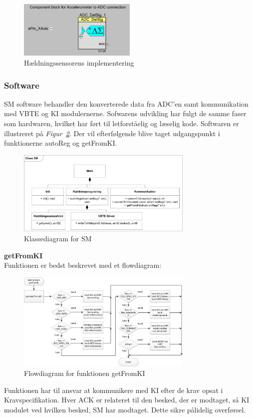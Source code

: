 \begin{figure}[htbp]
	\centering
	\includegraphics[width=0.50\textwidth]{billeder/levelsensor}
	\caption{Hældningssensorens implementering}
	\label{fig:levelsensor}
\end{figure}
\subsubsection{Software}
SM software behandler den konverterede data fra ADC'en samt kommunikation med VBTE og KI modulernerne. Sofwarens udvikling har fulgt de samme faser som hardwaren, hvilket har ført til letforståelig og læselig kode. Softwaren er illustreret på \textit{Figur~\ref{fig:SMKD}}. Der vil efterfølgende blive taget udgangspunkt i funktionerne autoReg og getFromKI.
\begin{figure}[H]
	\centering
	\includegraphics[width=0.75\textwidth]{billeder/smKlassediagram}
	\caption{Klassediagram for SM}
	\label{fig:SMKD}
\end{figure}
\textbf{getFromKI}\\
Funktionen er bedst beskrevet med et flowdiagram:
\begin{figure}[H]
	\centering
	\includegraphics[width=0.75\textwidth]{billeder/getFromKIflowchart}
	\caption{Flowdiagram for funktionen getFromKI}
	\label{fig:gFKIfc}
\end{figure}
Funktionen har til ansvar at kommunikere med KI efter de krav opsat i Kravspecifikation. Hver ACK er relateret til den besked, der er modtaget, så KI modulet ved hvilken besked, SM har modtaget. Dette sikre pålidelig overførsel. 